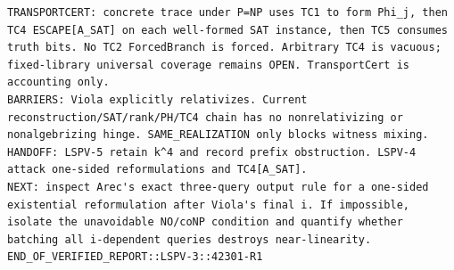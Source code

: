\documentclass[11pt]{article}
\begin{document}
\begin{Verbatim}[breaklines=true,breakanywhere=true]
TRANSPORTCERT: concrete trace under P=NP uses TC1 to form Phi_j, then TC4 ESCAPE[A_SAT] on each well-formed SAT instance, then TC5 consumes truth bits. No TC2 ForcedBranch is forced. Arbitrary TC4 is vacuous; fixed-library universal coverage remains OPEN. TransportCert is accounting only.
BARRIERS: Viola explicitly relativizes. Current reconstruction/SAT/rank/PH/TC4 chain has no nonrelativizing or nonalgebrizing hinge. SAME_REALIZATION only blocks witness mixing.
HANDOFF: LSPV-5 retain k^4 and record prefix obstruction. LSPV-4 attack one-sided reformulations and TC4[A_SAT].
NEXT: inspect Arec's exact three-query output rule for a one-sided existential reformulation after Viola's final i. If impossible, isolate the unavoidable NO/coNP condition and quantify whether batching all i-dependent queries destroys near-linearity.
END_OF_VERIFIED_REPORT::LSPV-3::42301-R1
\end{Verbatim}
\end{document}
